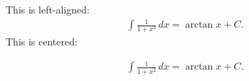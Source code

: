 \documentclass[fleqn]{article}
\begin{document}
\noindent This is left-aligned:
\begin{align}
   \int \frac{1}{1+x^2}\, dx = \arctan x + C.
\end{align}
This is centered:
\begin{ceqn}
\begin{align}
   \int \frac{1}{1+x^2}\, dx = \arctan x + C.
\end{align}
\end{ceqn}
\end{document}
